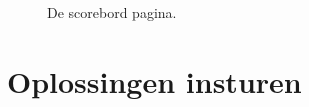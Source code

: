 \begin{figure}[p]
  \centering
  \caption{De scorebord pagina.}
  \label{fig:team-scoreboard}
\end{figure}

\newpage

\section{Oplossingen insturen}\label{submit}

